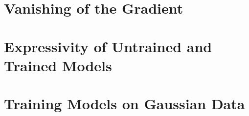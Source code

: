\section{Vanishing of the Gradient}\label{sec:Vanishing of the Gradient}

\section{Expressivity of Untrained and Trained Models}\label{sec:Vanishing Gradient}


\section{Training Models on Gaussian Data}\label{sec:Training Models on Gaussian Data}

